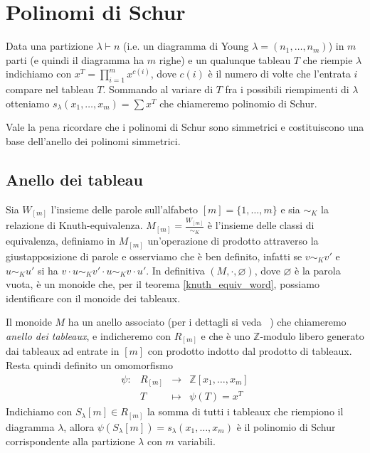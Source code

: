 \chapter{Polinomi di Schur}

\begin{defn}
Data una partizione $\lambda \vdash n$ (i.e. un diagramma di Young
$\lambda = (n_1, \ldots, n_m)$) in $m$ parti (e quindi il diagramma ha
$m$ righe) e un qualunque tableau $T$ che riempie $\lambda$ indichiamo
con $x^T = \prod\limits_{i = 1}^m x^{c(i)}$, dove $c(i)$ \`e il numero
di volte che l'entrata $i$ compare nel tableau $T$. Sommando al variare di
$T$ fra i possibili riempimenti di $\lambda$ otteniamo
\begin{math}
s_\lambda(x_1,\ldots,x_m) = \sum x^T
\end{math}
che chiameremo polinomio di Schur.
\end{defn}
Vale la pena ricordare che i polinomi di Schur sono simmetrici e costituiscono una base
dell'anello dei polinomi simmetrici.
\section{Anello dei tableau}

Sia $W_{[m]}$ l'insieme delle parole sull'alfabeto $[m]=\{1,\ldots,m\}$ e sia
$\sim_K$ la relazione di Knuth-equivalenza. $M_{[m]} =
\frac{W_{[m]}}{\sim_K}$ \`e l'insieme delle classi di equivalenza,
definiamo in $M_{[m]}$ un'operazione di prodotto attraverso la giustapposizione di parole e
osserviamo che \`e ben definito, infatti se $v \sim_K v'$ e $u \sim_K
u'$ si ha $v \cdot u \sim_K v' \cdot u \sim_K v \cdot u'$. In
definitiva $(M, \cdot, \varnothing)$, dove $\varnothing$ \`e la
parola vuota, \`e un monoide che, per il
teorema \ref{knuth_equiv_word}, possiamo identificare con il monoide
dei tableaux.

Il monoide $M$ ha un anello associato (per i dettagli si veda ~\cite{lang2002algebra}) che chiameremo \emph{anello dei tableaux}, e indicheremo con
$R_{[m]}$ e che \`e uno $\mathbb{Z}$-modulo libero generato dai
tableaux ad entrate in $[m]$ con prodotto indotto dal prodotto di tableaux.
Resta quindi definito un omomorfismo
\begin{equation}
\begin{matrix}\label{ring_tab}
\psi: & R_{[m]} & \rightarrow  & \mathbb{Z}[x_1,\ldots,x_m]\\
& T      & \mapsto & \psi(T)=x^T
\end{matrix}
\end{equation}
Indichiamo con $S_\lambda[m] \in R_{[m]}$ la somma di tutti i tableaux
che riempiono il diagramma $\lambda$, allora
$\psi(S_\lambda[m])=s_\lambda(x_1,\ldots,x_m)$ \`e il polinomio di
Schur corrispondente alla partizione $\lambda$ con $m$ variabili.

